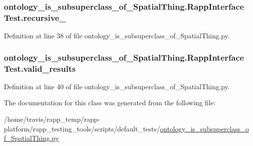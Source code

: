 \hypertarget{classontology__is__subsuperclass__of__SpatialThing_1_1RappInterfaceTest_a73c6e01c2e006cd4f6de0323cf845651}{
\subsubsection[{recursive\-\_\-}]{\setlength{\rightskip}{0pt plus 5cm}ontology\-\_\-is\-\_\-subsuperclass\-\_\-of\-\_\-\-Spatial\-Thing.\-Rapp\-Interface\-Test.\-recursive\-\_\-}}\label{classontology__is__subsuperclass__of__SpatialThing_1_1RappInterfaceTest_a73c6e01c2e006cd4f6de0323cf845651}


Definition at line 38 of file ontology\-\_\-is\-\_\-subsuperclass\-\_\-of\-\_\-\-Spatial\-Thing.\-py.

\hypertarget{classontology__is__subsuperclass__of__SpatialThing_1_1RappInterfaceTest_a6643a11c2835d7d6e72acf58b9ead5f7}{
\subsubsection[{valid\-\_\-results}]{\setlength{\rightskip}{0pt plus 5cm}ontology\-\_\-is\-\_\-subsuperclass\-\_\-of\-\_\-\-Spatial\-Thing.\-Rapp\-Interface\-Test.\-valid\-\_\-results}}\label{classontology__is__subsuperclass__of__SpatialThing_1_1RappInterfaceTest_a6643a11c2835d7d6e72acf58b9ead5f7}


Definition at line 40 of file ontology\-\_\-is\-\_\-subsuperclass\-\_\-of\-\_\-\-Spatial\-Thing.\-py.



The documentation for this class was generated from the following file\-:\begin{DoxyCompactItemize}
\item 
/home/travis/rapp\-\_\-temp/rapp-\/platform/rapp\-\_\-testing\-\_\-tools/scripts/default\-\_\-tests/\hyperlink{ontology__is__subsuperclass__of__SpatialThing_8py}{ontology\-\_\-is\-\_\-subsuperclass\-\_\-of\-\_\-\-Spatial\-Thing.\-py}\end{DoxyCompactItemize}
